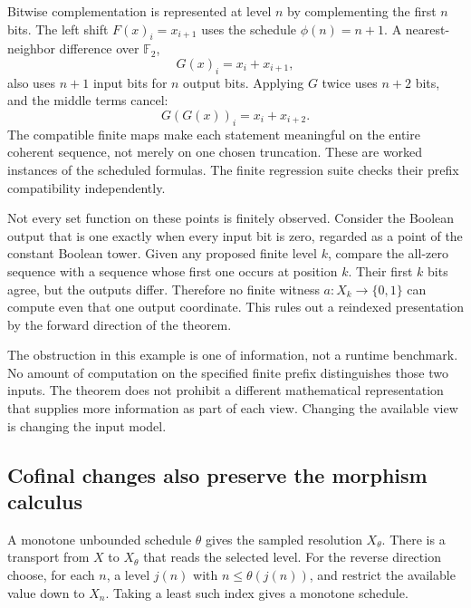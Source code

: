 Bitwise complementation is represented at level \(n\) by complementing the first \(n\) bits. The left shift \(F(x)_i=x_{i+1}\) uses the schedule \(\phi(n)=n+1\). A nearest-neighbor difference over \(\mathbb F_2\),
\[
 G(x)_i=x_i+x_{i+1},
\]
also uses \(n+1\) input bits for \(n\) output bits. Applying \(G\) twice uses \(n+2\) bits, and the middle terms cancel:
\[
 G(G(x))_i=x_i+x_{i+2}.
\]
The compatible finite maps make each statement meaningful on the entire coherent sequence, not merely on one chosen truncation. These are worked instances of the scheduled formulas. The finite regression suite checks their prefix compatibility independently.

Not every set function on these points is finitely observed. Consider the Boolean output that is one exactly when every input bit is zero, regarded as a point of the constant Boolean tower. Given any proposed finite level \(k\), compare the all-zero sequence with a sequence whose first one occurs at position \(k\). Their first \(k\) bits agree, but the outputs differ. Therefore no finite witness \(a:X_k\to\{0,1\}\) can compute even that one output coordinate. This rules out a reindexed presentation by the forward direction of the theorem.

The obstruction in this example is one of information, not a runtime benchmark. No amount of computation on the specified finite prefix distinguishes those two inputs. The theorem does not prohibit a different mathematical representation that supplies more information as part of each view. Changing the available view is changing the input model.

\subsection{Cofinal changes also preserve the morphism calculus}
A monotone unbounded schedule \(\theta\) gives the sampled resolution \(X_\theta\). There is a transport from \(X\) to \(X_\theta\) that reads the selected level. For the reverse direction choose, for each \(n\), a level \(j(n)\) with \(n\le\theta(j(n))\), and restrict the available value down to \(X_n\). Taking a least such index gives a monotone schedule.

